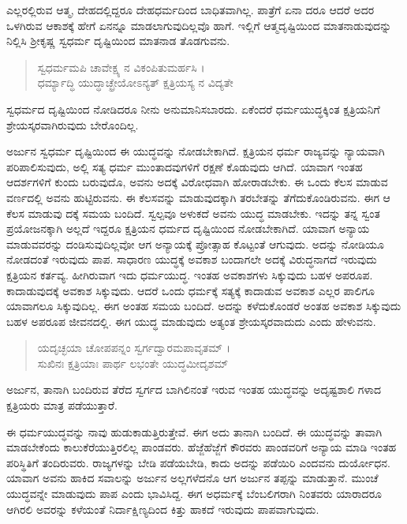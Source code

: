 ಎಲ್ಲರಲ್ಲಿರುವ ಆತ್ಮ, ದೇಹದಲ್ಲಿದ್ದರೂ ದೇಹಧರ್ಮದಿಂದ ಬಾಧಿತವಾಗಿಲ್ಲ. ಪಾತ್ರೆಗೆ ಏನಾ ದರೂ ಆದರೆ ಅದರ ಒಳಗಿರುವ ಆಕಾಶಕ್ಕೆ ಹೇಗೆ ಏನನ್ನೂ ಮಾಡಲಾಗುವುದಿಲ್ಲವೊ ಹಾಗೆ. ಇಲ್ಲಿಗೆ ಆತ್ಮದೃಷ್ಟಿಯಿಂದ ಮಾತನಾಡುವುದನ್ನು ನಿಲ್ಲಿಸಿ ಶ್ರೀಕೃಷ್ಣ ಸ್ವಧರ್ಮ ದೃಷ್ಟಿಯಿಂದ ಮಾತನಾಡ ತೊಡಗುವನು.

\begin{verse}
ಸ್ವಧರ್ಮಮಪಿ ಚಾವೇಕ್ಷ್ಯ ನ ವಿಕಂಪಿತುಮರ್ಹಸಿ ।\\ಧರ್ಮ್ಯಾದ್ಧಿ ಯುದ್ಧಾಚ್ಛ್ರೇಯೋಽನ್ಯತ್ ಕ್ಷತ್ರಿಯಸ್ಯ ನ ವಿದ್ಯತೇ 
\end{verse}

{\small ಸ್ವಧರ್ಮದ ದೃಷ್ಟಿಯಿಂದ ನೋಡಿದರೂ ನೀನು ಅನುಮಾನಿಸಬಾರದು. ಏಕೆಂದರೆ ಧರ್ಮಯುದ್ಧಕ್ಕಿಂತ ಕ್ಷತ್ರಿಯನಿಗೆ ಶ್ರೇಯಸ್ಕರವಾಗಿರುವುದು ಬೇರೊಂದಿಲ್ಲ.}

ಅರ್ಜುನ ಸ್ವಧರ್ಮ ದೃಷ್ಟಿಯಿಂದ ಈ ಯುದ್ಧವನ್ನು ನೋಡಬೇಕಾಗಿದೆ. ಕ್ಷತ್ರಿಯನ ಧರ್ಮ ರಾಜ್ಯವನ್ನು ನ್ಯಾಯವಾಗಿ ಪರಿಪಾಲಿಸುವುದು, ಅಲ್ಲಿ ಸತ್ಯ ಧರ್ಮ ಮುಂತಾದವುಗಳಿಗೆ ರಕ್ಷಣೆ ಕೊಡುವುದು ಆಗಿದೆ. ಯಾವಾಗ ಇಂತಹ ಆದರ್ಶಗಳಿಗೆ ಕುಂದು ಬರುವುದೊ, ಅವನು ಅದಕ್ಕೆ ವಿರೋಧವಾಗಿ ಹೋರಾಡಬೇಕು. ಈ ಒಂದು ಕೆಲಸ ಮಾಡುವ ವರ್ಣದಲ್ಲಿ ಅವನು ಹುಟ್ಟಿರುವನು. ಈ ಕೆಲಸವನ್ನು ಮಾಡುವುದಕ್ಕಾಗಿ ತರಬೇತನ್ನು ತೆಗೆದುಕೊಂಡಿರುವನು. ಈಗ ಆ ಕೆಲಸ ಮಾಡುವು ದಕ್ಕೆ ಸಮಯ ಬಂದಿದೆ. ಸ್ವಲ್ಪವೂ ಅಳುಕದೆ ಅವನು ಯುದ್ಧ ಮಾಡಬೇಕು. ಇದನ್ನು ತನ್ನ ಸ್ವಂತ ಪ್ರಯೋಜನಕ್ಕಾಗಿ ಅಲ್ಲದೆ ಇದ್ದರೂ ಕ್ಷತ್ರಿಯನ ಧರ್ಮದ ದೃಷ್ಟಿಯಿಂದ ನೋಡಬೇಕಾಗಿದೆ. ಯಾವಾಗ ಅನ್ಯಾಯ ಮಾಡುವವರನ್ನು ದಂಡಿಸುವುದಿಲ್ಲವೋ ಆಗ ಅನ್ಯಾಯಕ್ಕೆ ಪ್ರೋತ್ಸಾಹ ಕೊಟ್ಟಂತೆ ಆಗುವುದು. ಅದನ್ನು ನೋಡಿಯೂ ನೋಡದಂತೆ ಇರುವುದು ಪಾಪ. ಸಾಧಾರಣ ಯುದ್ಧಕ್ಕೆ ಅವಕಾಶ ಬಂದಾಗಲೇ ಅದಕ್ಕೆ ವಿರುದ್ಧನಾಗದೆ ಇರುವುದು ಕ್ಷತ್ರಿಯನ ಕರ್ತವ್ಯ. ಹೀಗಿರುವಾಗ ಇದು ಧರ್ಮಯುದ್ಧ. ಇಂತಹ ಅವಕಾಶಗಳು ಸಿಕ್ಕುವುದು ಬಹಳ ಅಪರೂಪ. ಕಾದಾಡುವುದಕ್ಕೆ ಅವಕಾಶ ಸಿಕ್ಕುವುದು. ಆದರೆ ಒಂದು ಧರ್ಮಕ್ಕೆ ಸತ್ಯಕ್ಕೆ ಕಾದಾಡುವ ಅವಕಾಶ ಎಲ್ಲರ ಪಾಲಿಗೂ ಯಾವಾಗಲೂ ಸಿಕ್ಕುವುದಿಲ್ಲ. ಈಗ ಅಂತಹ ಸಮಯ ಬಂದಿದೆ. ಅದನ್ನು ಕಳೆದುಕೊಂಡರೆ ಅಂತಹ ಅವಕಾಶ ಸಿಕ್ಕುವುದು ಬಹಳ ಅಪರೂಪ ಜೀವನದಲ್ಲಿ. ಈಗ ಯುದ್ಧ ಮಾಡುವುದು ಅತ್ಯಂತ ಶ್ರೇಯಸ್ಕರವಾದುದು ಎಂದು ಹೇಳುವನು.

\begin{verse}
ಯದೃಚ್ಛಯಾ ಚೋಪಪನ್ನಂ ಸ್ವರ್ಗದ್ವಾರಮಪಾವೃತಮ್ ।\\ಸುಖಿನಃ ಕ್ಷತ್ರಿಯಾಃ ಪಾರ್ಥ ಲಭಂತೇ ಯುದ್ಧಮೀದೃಶಮ್ 
\end{verse}

{\small ಅರ್ಜುನ, ತಾನಾಗಿ ಬಂದಿರುವ ತೆರೆದ ಸ್ವರ್ಗದ ಬಾಗಿಲಿನಂತೆ ಇರುವ ಇಂತಹ ಯುದ್ಧವನ್ನು ಅದೃಷ್ಟಶಾಲಿ ಗಳಾದ ಕ್ಷತ್ರಿಯರು ಮಾತ್ರ ಪಡೆಯುತ್ತಾರೆ.}

ಈ ಧರ್ಮಯುದ್ಧವನ್ನು ನಾವು ಹುಡುಕಾಡುತ್ತಿರುತ್ತೇವೆ. ಈಗ ಅದು ತಾನಾಗಿ ಬಂದಿದೆ. ಈ ಯುದ್ಧವನ್ನು ತಾವಾಗಿ ಮಾಡಬೇಕೆಂದು ಕಾಲುಕೆರೆಯುತ್ತಿರಲಿಲ್ಲ ಪಾಂಡವರು. ಹೆಜ್ಜೆಹೆಜ್ಜೆಗೆ ಕೌರವರು ಪಾಂಡವರಿಗೆ ಅನ್ಯಾಯ ಮಾಡಿ ಇಂತಹ ಪರಿಸ್ಥಿತಿಗೆ ತಂದಿರುವರು. ರಾಜ್ಯಗಳನ್ನು ಬೇಡಿ ಪಡೆಯಬೇಡಿ, ಕಾದು ಅದನ್ನು ಪಡೆಯಿರಿ ಎಂದವನು ದುರ್ಯೋಧನ. ಯಾವಾಗ ಅವನು ಹಾಕಿದ ಸವಾಲನ್ನು ಅರ್ಜುನ ಅಲ್ಲಗಳೆದನೊ ಆಗ ಅರ್ಜುನ ತಪ್ಪನ್ನು ಮಾಡುತ್ತಾನೆ. ಮುಂಚೆ ಯುದ್ಧವನ್ನೇ ಮಾಡುವುದು ಪಾಪ ಎಂದು ಭಾವಿಸಿದ್ದ. ಈಗ ಅಧರ್ಮಕ್ಕೆ ಬೆಂಬಲಿಗರಾಗಿ ನಿಂತವರು ಯಾರಾದರೂ ಆಗಿರಲಿ ಅವರನ್ನು ಕಳೆಯಂತೆ ನಿರ್ದಾಕ್ಷಿಣ್ಯದಿಂದ ಕಿತ್ತು ಹಾಕದೆ ಇರುವುದು ಪಾಪವಾಗುವುದು.

